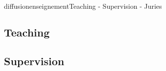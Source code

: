 \documentclass{ra2018}
\begin{document}
\begin{module}{diffusion}{enseignement}{Teaching - Supervision - Juries}

\subsection {Teaching}


%


\subsection {Supervision}



\end{module}
\end{document}
